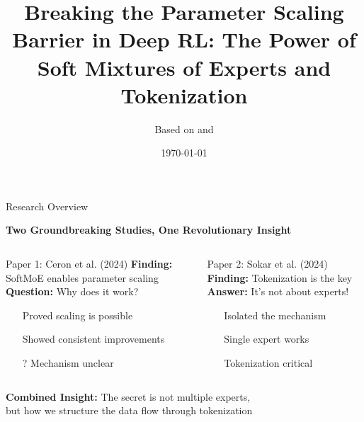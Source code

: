 \documentclass{beamer}
\title[MoE \& Tokenization in Deep RL]{Breaking the Parameter Scaling Barrier in Deep RL: The Power of Soft Mixtures of Experts and Tokenization}
\author[Research Presentation]{Based on \fcite{ceron2024mixtures} and \fcite{sokar2024tokenize}}
\institute{Beijing Institute for General Artificial Intelligence (BIGAI)}
\date{\today}
\begin{document}
\begin{frame}
  \titlepage
\end{frame}

\begin{frame}{Research Overview}
  \begin{center}
    \Large \textbf{Two Groundbreaking Studies, One Revolutionary Insight}
  \end{center}
  
  \vspace{0.5em}
  \begin{columns}[T]
    \begin{column}{0.48\textwidth}
      \begin{block}{Paper 1: Ceron et al. (2024)}
        \small
        \textbf{Finding:} SoftMoE enables parameter scaling\\
        \textbf{Question:} Why does it work?
        \begin{itemize}
          \item[\checkmark] Proved scaling is possible
          \item[\checkmark] Showed consistent improvements
          \item[?] Mechanism unclear
        \end{itemize}
      \end{block}
    \end{column}
    \begin{column}{0.48\textwidth}
      \begin{block}{Paper 2: Sokar et al. (2024)}
        \small
        \textbf{Finding:} Tokenization is the key\\
        \textbf{Answer:} It's not about experts!
        \begin{itemize}
          \item[\checkmark] Isolated the mechanism
          \item[\checkmark] Single expert works
          \item[\checkmark] Tokenization critical
        \end{itemize}
      \end{block}
    \end{column}
  \end{columns}
  
  \vspace{1em}
  \begin{center}
    \colorbox{blue!20}{\parbox{0.8\textwidth}{\centering
    \textbf{Combined Insight:} The secret is not multiple experts,\\
    but how we structure the data flow through tokenization}}
  \end{center}
\end{frame}
\end{document}
